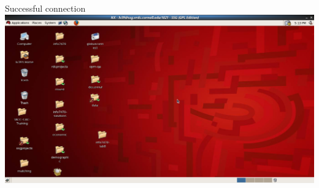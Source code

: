 \documentclass[xcolor=table,compress]{beamer}
\begin{document}
\begin{frame}{Successful connection}
\centering
\includegraphics[width=1\textheight]{nx-logged-on.png}
\end{frame}


%
%
%
\end{document}
